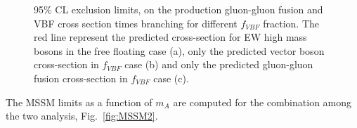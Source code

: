 \begin{figure}[htb]
\centering
{}
\caption{95\% CL exclusion limits, on the production gluon-gluon fusion and VBF cross section times branching 
for different $f_{VBF}$ fraction. The red line represent the predicted cross-section for EW high
mass bosons in the free floating case (a), only the predicted vector boson cross-section in
 $f_{VBF}$ case (b) and only the predicted gluon-gluon fusion cross-section in $f_{VBF}$ case (c).}
    \label{wwe}
\end{figure}
The MSSM limits  as a function of $m_A$ are computed for the combination among the two analysis, Fig.~\ref{fig:MSSM2}.
